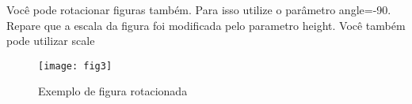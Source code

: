 \documentclass[	DIV=calc,%
paper=a4,%
fontsize=12pt,%
onecolumn]{scrartcl}	 					%
\begin{document}
	Você pode rotacionar figuras também. Para isso utilize o parâmetro angle=-90. Repare que a escala da figura foi modificada pelo parametro height. Você também pode utilizar scale
	
	\begin{figure}
		\centering
		\texttt{[image: fig3]}
		\caption{Exemplo de figura rotacionada}
		\label{fig3}
	\end{figure}
	
	
	
\end{document}
